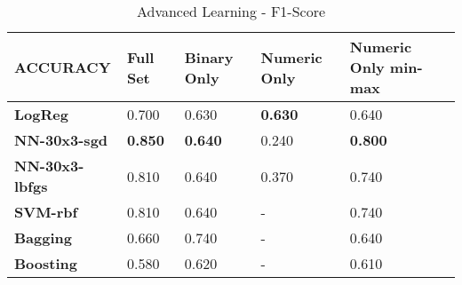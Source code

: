 \documentclass[10pt, conference, compsocconf]{IEEEtran}
\begin{document}
\begin{center}
	\begin{table}[h]
		\centering \footnotesize
		\vspace{0.01cm}
		\caption{Advanced Learning - F1-Score}
		\hspace{1cm}
		\begin{tabularx}{\linewidth}{ l  X  X  X  X }
			\hline
			\textbf{ACCURACY} &	\textbf{Full Set}&	\textbf{Binary Only}&	\textbf{Numeric Only}&	\textbf{Numeric Only min-max} \\ \hline
			
			
			\textbf{LogReg}&	0.700&	0.630&	\textbf{0.630}&	0.640 \\ \hline
			\textbf{NN-30x3-sgd}&	\textbf{0.850}&	\textbf{0.640}&	0.240&	\textbf{0.800} \\ \hline
			\textbf{NN-30x3-lbfgs}&	0.810&	0.640&	0.370&	0.740 \\ \hline
			\textbf{SVM-rbf}&	0.810&	0.640&	-&	0.740 \\ \hline
			\textbf{Bagging}&	0.660&	0.740&	-&	0.640 \\ \hline
			\textbf{Boosting}&	0.580&	0.620&	-&	0.610 \\ \hline
			
			
		\end{tabularx}\newline
		\vspace{-0.05cm}
		\label{Table6}
	\end{table} \hfil
\end{center}
\end{document}
